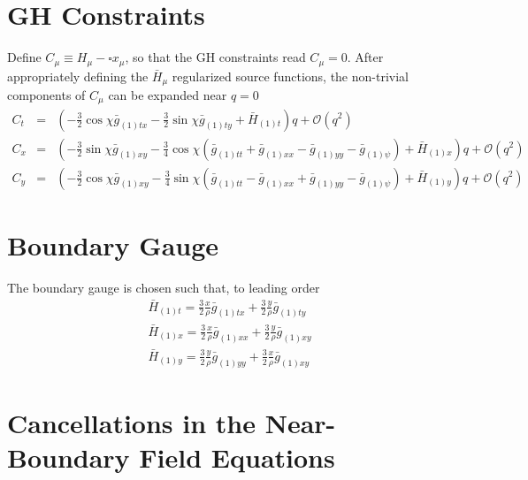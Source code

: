 \documentclass[12pt]{article}
\begin{document}
\iffalse
\section{GH Constraints}

Define $C_\mu \equiv H_\mu - \square x_\mu$, so that the GH constraints read $C_\mu=0$. After appropriately 
defining the $\bar{H}_\mu$ regularized source functions, the non-trivial components of $C_\mu$ can be expanded near $q=0$
\begin{eqnarray}\label{eqn:nearbdyghconstraints}
C_t    &=& ( -\frac{3}{2}\cos\chi\bar{g}_{(1) tx} - \frac{3}{2}\sin\chi\bar{g}_{(1) ty} + \bar{H}_{(1) t} )q + \mathcal{O}(q^2) \nonumber \\
C_x    &=& ( -\frac{3}{2}\sin\chi\bar{g}_{(1) xy} - \frac{3}{4}\cos\chi(\bar{g}_{(1) tt}+\bar{g}_{(1) xx}-\bar{g}_{(1) yy}-\bar{g}_{(1) \psi}) + \bar{H}_{(1) x} )q + \mathcal{O}(q^2) \nonumber \\
C_y    &=& ( -\frac{3}{2}\cos\chi\bar{g}_{(1) xy} - \frac{3}{4}\sin\chi(\bar{g}_{(1) tt}-\bar{g}_{(1) xx}+\bar{g}_{(1) yy}-\bar{g}_{(1) \psi}) + \bar{H}_{(1) y} )q + \mathcal{O}(q^2) \nonumber 
\end{eqnarray}





\section{Boundary Gauge}

The boundary gauge is chosen such that, to leading order
\begin{eqnarray}
\bar{H}_{(1) t} = \frac{3}{2}\frac{x}{\rho} \bar{g}_{(1) tx} + \frac{3}{2}\frac{y}{\rho} \bar{g}_{(1) ty} \nonumber \\
\bar{H}_{(1) x} = \frac{3}{2}\frac{x}{\rho} \bar{g}_{(1) xx} + \frac{3}{2}\frac{y}{\rho} \bar{g}_{(1) xy}\nonumber \\
\bar{H}_{(1) y} = \frac{3}{2}\frac{y}{\rho} \bar{g}_{(1) yy} + \frac{3}{2}\frac{x}{\rho} \bar{g}_{(1) xy}\nonumber 
\end{eqnarray}





\section{Cancellations in the Near-Boundary Field Equations}
\end{document}
